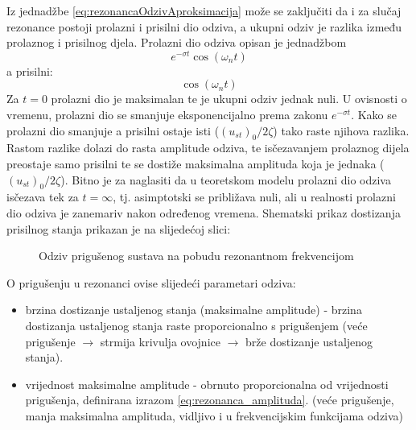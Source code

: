 Iz jednadžbe \eqref{eq:rezonancaOdzivAproksimacija} može se zaključiti da i za
slučaj rezonance postoji prolazni i prisilni dio odziva, a ukupni odziv je razlika
između prolaznog i prisilnog djela. Prolazni dio odziva opisan je jednadžbom
\[
    e^{-\sigma t} \cos(\omega_n t)
\]
a prisilni:
\[
    \cos(\omega_n t)
\]
Za $t=0$ prolazni dio je maksimalan te je ukupni odziv jednak nuli. U ovisnosti o
vremenu, prolazni dio se smanjuje eksponencijalno prema zakonu $e^{-\sigma t}$. Kako
se prolazni dio smanjuje a prisilni ostaje isti ($(u_{st})_0/2\zeta$) tako raste
njihova razlika. Rastom razlike dolazi do rasta amplitude odziva, te isčezavanjem
prolaznog dijela preostaje samo prisilni te se dostiže maksimalna amplituda koja je
jednaka ($(u_{st})_0/2\zeta$). Bitno je za naglasiti da u teoretskom modelu
prolazni dio odziva isčezava tek za $t=\infty$, tj. asimptotski se približava nuli,
ali u realnosti prolazni dio odziva je zanemariv nakon određenog vremena. Shematski
prikaz dostizanja prisilnog stanja prikazan je na slijedećoj slici:
\begin{figure}[H]
     
    \caption{Odziv prigušenog sustava na pobudu rezonantnom frekvencijom}
    \label{fig:rezonanca-priguseno}
\end{figure}

O prigušenju u rezonanci ovise slijedeći parametari odziva:
\begin{itemize}
    \item brzina dostizanje ustaljenog stanja (maksimalne amplitude) - brzina dostizanja 
        ustaljenog stanja raste proporcionalno s prigušenjem (veće prigušenje $\to$ strmija krivulja
        ovojnice $\to$ brže dostizanje ustaljenog stanja).

    \item vrijednost maksimalne amplitude - obrnuto proporcionalna od vrijednosti
        prigušenja, definirana izrazom \eqref{eq:rezonanca_amplituda}. 
        (veće prigušenje, manja maksimalna amplituda, vidljivo i u frekvencijskim funkcijama odziva)
\end{itemize}

